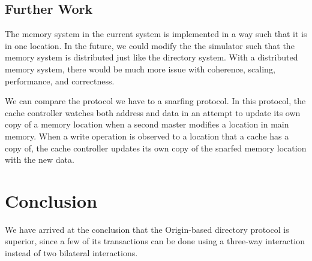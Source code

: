 \documentclass[letterpaper]{article}
\begin{document}
\subsection{Further Work}
The memory system in the current system is implemented in a way such that it is in one location. In the future, we could modify the the simulator such that the memory system is distributed just like the directory system. With a distributed memory system, there would be much more issue with coherence, scaling, performance, and correctness.

We can compare the protocol we have to a snarfing protocol. In this protocol, the cache controller watches both address and data in an attempt to update its own copy of a memory location when a second master modifies a location in main memory. When a write operation is observed to a location that a cache has a copy of, the cache controller updates its own copy of the snarfed memory location with the new data.\cite{FAR00}\cite{LAU00}

\section{Conclusion}
We have arrived at the conclusion that the Origin-based directory protocol is superior, since a few of its transactions can be done using a three-way interaction instead of two bilateral interactions.


\end{document}
